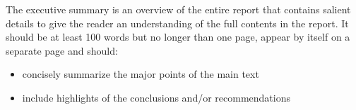\begin{Executive Summary}
The executive summary is an overview of the entire report that contains salient details to give the reader an understanding of the full contents in the report. It should be at least 100 words but no longer than one page, appear by itself on a separate page and should:

\begin{itemize}
  \item concisely summarize the major points of the main text
  \item include highlights of the conclusions and/or recommendations
\end{itemize}
\end{Executive Summary}
